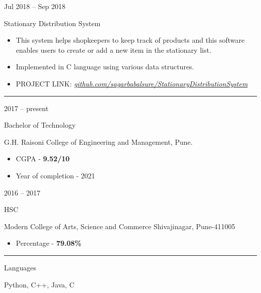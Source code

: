\documentclass[a4paper,10pt]{article}
\newlength{\cvcolumngapwidth}
\newlength{\cvleftcolumnwidth}
\newlength{\cvrightcolumnwidth}
\newcommand{\cvsectionstyle}[1]{{\normalsize\cvsectionfont\textcolor{cvsectioncolor}{#1}}}
\newcommand{\cvtitlestyle}[1]{{\large\cvtitlefont\textcolor{cvtitlecolor}{#1}}}
\newcommand{\cvdurationstyle}[1]{{\small\cvdurationfont\textcolor{cvdurationcolor}{#1}}}
\newcommand{\cvheadingstyle}[1]{{\normalsize\cvheadingfont\textcolor{cvheadingcolor}{#1}}}
\newlength{\cvafteritemskipamount}
\newlength{\cvaftersectionskipamount}
\newlength{\cvbetweensectionandheadingextraskipamount}
\newlength{\cvaftertitleskipamount}
\newlength{\cvparskip}
\newcommand{\cvsection}[1]{
    \begin{minipage}[t]{\cvleftcolumnwidth}
        \raggedleft\cvsectionstyle{#1}
    \end{minipage}%
    \hspace{\cvcolumngapwidth}%
    \begin{minipage}[t]{\cvrightcolumnwidth}
        \textcolor{cvrulecolor}{\rule{\cvrightcolumnwidth}{0.3mm}}
    \end{minipage}

    \vspace{\cvaftersectionskipamount}
}
\newcommand{\cvitem}[2]{
    \begin{minipage}[t]{\cvleftcolumnwidth}
        \raggedleft #1
    \end{minipage}%
    \hspace{\cvcolumngapwidth}%
    \begin{minipage}[t]{\cvrightcolumnwidth}
        \setlength{\parskip}{\cvparskip} #2
    \end{minipage}

    \vspace{\cvafteritemskipamount}
}
\newcommand{\cvtitle}[1]{
    \cvtitlestyle{#1}

    \vspace{\cvaftertitleskipamount}
    \vspace{-\cvparskip}
}
\begin{document}
\cvitem{
    \cvdurationstyle{Jul 2018 -- Sep 2018}
}{
    \cvtitle{Stationary Distribution System}


    \begin{itemize}[leftmargin=*]
         \item This system helps shopkeepers to keep track of products and this software enables users to create or add a new item in the stationary list.
         \item Implemented in C language using various data structures.
         \item PROJECT LINK: 
         \textit{\href{https://github.com/sagarbabalsure/StationaryDistributionSystem}{github.com/sagarbabalsure/StationaryDistributionSystem}}
    \end{itemize}
}



\cvsection{EDUCATION}

\cvitem{
    \cvdurationstyle{2017 -- present}
}{
    \cvtitle{Bachelor of Technology}

    G.H. Raisoni College of Engineering and Management, Pune.

    \begin{itemize}[leftmargin=*]
        \item CGPA - \textbf{9.52/10}
        \item Year of completion - 2021
    \end{itemize}
}

\cvitem{
    \cvdurationstyle{2016 -- 2017}
}{
    \cvtitle{HSC}

   Modern College of Arts, Science and Commerce Shivajinagar, Pune-411005

    \begin{itemize}[leftmargin=*]
        \item Percentage - \textbf{79.08\%}
    \end{itemize}
}
\bigskip


\cvsection{SKILLS}

\vspace{\cvbetweensectionandheadingextraskipamount}

\cvitem{
    \cvheadingstyle{Languages}
}{
    \item Python, C++, Java, C
}
\end{document}
